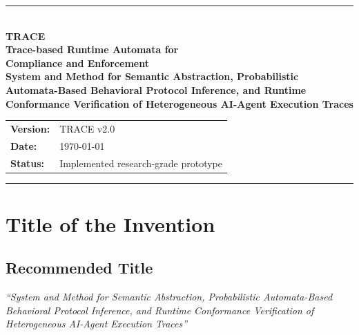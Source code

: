 \documentclass[11pt,a4paper]{article}
\title{\vspace{-1.5cm}}
\date{}
\begin{document}
\begin{titlepage}
\centering
\vspace*{1.5cm}

{\color{traceblue}\rule{0.6\textwidth}{1.2pt}}\\[1.2cm]

{\Huge\bfseries\color{traceblue} TRACE}\\[0.5cm]

{\Large\bfseries Trace-based Runtime Automata for\\
Compliance and Enforcement}\\[1.5cm]

{\large \bfseries
System and Method for Semantic Abstraction, Probabilistic\\
Automata-Based Behavioral Protocol Inference, and Runtime\\
Conformance Verification of Heterogeneous AI-Agent Execution Traces
}\\[2cm]

\begin{tabular}{ll}
\textbf{Version:} & TRACE v2.0 \\
\textbf{Date:} & \today \\
\textbf{Status:} & Implemented research-grade prototype \\
\end{tabular}

\vfill


\vspace{0.7cm}

{\color{traceblue}\rule{0.6\textwidth}{0.8pt}}

\end{titlepage}

\tableofcontents
\thispagestyle{empty}
\newpage

\section{Title of the Invention}

\subsection*{Recommended Title}

\begin{center}
\begin{minipage}{0.9\textwidth}
\centering
\large\itshape
``System and Method for Semantic Abstraction, Probabilistic Automata-Based Behavioral
Protocol Inference, and Runtime Conformance Verification of Heterogeneous AI-Agent
Execution Traces''
\end{minipage}
\end{center}
\end{document}
